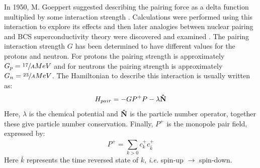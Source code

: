 In 1950, M. Goeppert suggested describing the pairing force as a delta function multiplied by some interaction strength \cite{pairingFirstTheory}. Calculations were performed using this interaction to explore its effects \cite{pairingCorrEffectOnProperties} and then later analogies between nuclear pairing and BCS superconductivity theory \cite{bcsTheory} were discovered and examined \cite{pairingAnalogyToBCS,pairingSuperfluidity}. The pairing interaction strength $G$ has been determined to have different values for the protons and neutron. For protons the pairing strength is approximately $G_p=\sfrac{17}{A} MeV$ and for neutrons the pairing strength is approximately $G_n=\sfrac{23}{A} MeV$. The Hamiltonian to describe this interaction is usually written as:
\begin{equation}
\label{eqn:chp2-pairing-hamil}
H_{pair} = -GP^+P-\lambda{}\boldsymbol{\hat{\textbf{N}}}
\end{equation}
Here, $\lambda$ is the chemical potential and $\boldsymbol{\hat{\textbf{N}}}$ is the particle number operator, together these give particle number conservation. Finally, $P^+$ is the monopole pair field, expressed by:
\begin{equation}
\label{eqn:chp2-monopole-pair-op}
P^+=\sum\limits_{k>0}^{}c^+_kc^+_{\bar{k}}
\end{equation}
Here $\bar{k}$ represents the time reversed state of $k$, \emph{i.e.} spin-up $\rightarrow$ spin-down.


